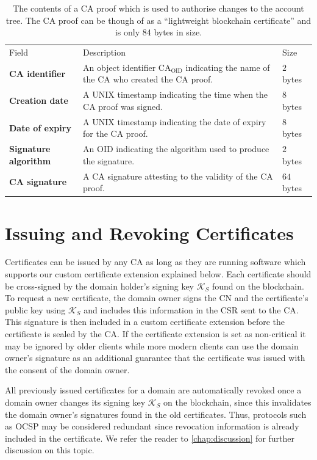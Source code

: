 \documentclass{style/kththesis}
\begin{document}
\begin{table}[t]
\caption{The contents of a CA proof which is used to authorise changes to the account tree. The CA proof can be though of as a ``lightweight blockchain certificate'' and is only 84 bytes in size.}
\label{tab:ca-proof}
\begin{tabularx}{\textwidth}{lXl}
\cmidrule(r){1-3}
Field & Description & Size \\ 
\cmidrule(r){1-3}
\textbf{CA identifier} & An object identifier $\text{CA}_{\text{OID}}$ indicating the name of the CA who created the CA proof. & $2$ bytes \\
\textbf{Creation date} & A UNIX timestamp indicating the time when the CA proof was signed. & $8$ bytes \\
\textbf{Date of expiry} & A UNIX timestamp indicating the date of expiry for the CA proof. & $8$ bytes \\
\textbf{Signature algorithm} & An OID indicating the algorithm used to produce the signature. & $2$ bytes \\
\textbf{CA signature} & A CA signature attesting to the validity of the CA proof. & $64$ bytes\footnotemark 
\end{tabularx}
\end{table}


\section{Issuing and Revoking Certificates}
Certificates can be issued by any CA as long as they are running software which supports our custom certificate extension explained below. Each certificate should be cross-signed by the domain holder's signing key $\mathcal{K}_S$ found on the blockchain. To request a new certificate, the domain owner signs the CN and the certificate's public key using $\mathcal{K}_S$ and includes this information in the CSR sent to the CA. This signature is then included in a custom certificate extension before the certificate is sealed by the CA. If the certificate extension is set as non-critical it may be ignored by older clients while more modern clients can use the domain owner's signature as an additional guarantee that the certificate was issued with the consent of the domain owner.

All previously issued certificates for a domain are automatically revoked once a domain owner changes its signing key $\mathcal{K}_S$ on the blockchain, since this invalidates the domain owner's signatures found in the old certificates. Thus, protocols such as OCSP may be considered redundant since revocation information is already included in the certificate. We refer the reader to \cref{chap:discussion} for further discussion on this topic.
\end{document}
